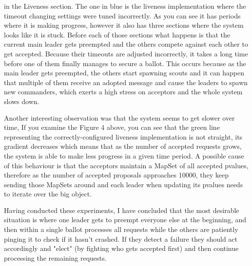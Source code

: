 \documentclass[11pt]{article}
\begin{document}
in the Liveness section. The one in blue is the liveness implementation where the
timeout changing settings were tuned incorrectly. As you can see it has periods
where it is making progress, however it also has three sections where the system
looks like it is stuck. Before each of those sections what happens is that the current
main leader gets preempted and the others compete against each other to get accepted.
Because their timeouts are adjusted incorrectly, it takes a long time before one of
them finally manages to secure a ballot. This occurs because as the main leader gets
preempted, the others start spawning scouts and it can happen that multiple of them receive
an adopted message and cause the leaders to spawn new commanders, which exerts a high
stress on acceptors and the whole system slows down.

Another interesting observation was that the system seems to get slower over time,
If you examine the Figure 4 above, you can see that the green line representing
the correctly-configured liveness implementation is not straight, its gradient decreases
which means that as the number of accepted requests grows, the system is able to
make less progress in a given time period. A possible cause of this behaviour
is that the acceptors maintain a MapSet of all accepted pvalues, therefore as the
number of accepted proposals approaches 10000, they keep sending those MapSets around
and each leader when updating its pvalues needs to iterate over the big object.

Having conducted these experiments, I have concluded that the most desirable
situation is where one leader gets to preempt everyone else at the beginning, and
then within a single ballot processes all requests while the others are patiently
pinging it to check if it hasn't crashed. If they detect a failure they should
act accordingly and "elect" (by fighting who gets accepted first) and then continue
processing the remaining requests.
\end{document}
